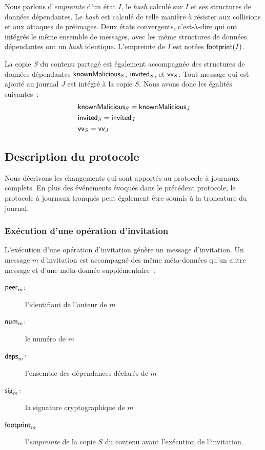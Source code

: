 Nous parlons d'\emph{empreinte} d'un état $I$, le \emph{hash} calculé sur $I$ et ses structures de données dépendantes.
Le \emph{hash} est calculé de telle manière à résister aux collisions et aux attaques de préimages.
Deux états convergents, c'est-à-dire qui ont intégrés le même ensemble de messages, avec les même structures de données dépendantes ont un \emph{hash} identique.
L'empreinte de $I$ est notées $\operatorname{\mathsf{footprint}}(I)$.

La copie $S$ du contenu partagé est également accompagnée des structures de données dépendantes $\operatorname{\mathsf{knownMalicious}}_S$, $\operatorname{\mathsf{invited}}_S$, et $\operatorname{\mathsf{vv}}_S$.
Tout message qui est ajouté au journal $J$ est intégré à la copie $S$.
Nous avons donc les égalités suivantes~:
\begin{align*}
&\operatorname{\mathsf{knownMalicious}}_S = \operatorname{\mathsf{knownMalicious}}_J\\
&\operatorname{\mathsf{invited}}_S = \operatorname{\mathsf{invited}}_J\\
&\operatorname{\mathsf{vv}}_S = \operatorname{\mathsf{vv}}_J
\end{align*}


\subsection{Description du protocole}

Nous décrivons les changements qui sont apportés au protocole à journaux complets.
En plus des événements évoqués dans le précédent protocole, le protocole à journaux tronqués peut également être soumis à la troncature du journal.

\subsubsection{Exécution d'une opération d'invitation}

L'exécution d'une opération d'invitation génère un message d'invitation.
Un message $m$ d'invitation est accompagné des même méta-données qu'un autre message et d'une méta-donnée supplémentaire~:
\begin{description}
    \item[$\operatorname{\mathsf{peer}}_m$:] l'identifiant de l'auteur de $m$ 
    \item[$\operatorname{\mathsf{num}}_m$:] le numéro de $m$
    \item[$\operatorname{\mathsf{deps}}_m$:] l'ensemble des dépendances déclarés de $m$
    \item[$\operatorname{\mathsf{sig}}_m$:] la signature cryptographique de $m$
    \item[$\operatorname{\mathsf{footprint}}_m$] l'\emph{empreinte} de la copie $S$ du contenu avant l'exécution de l'invitation.
\end{description}


